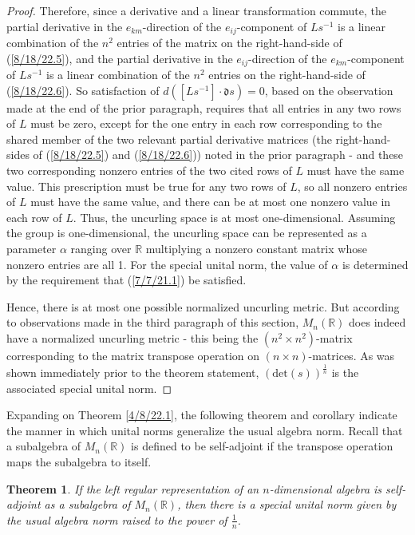 \documentclass{amsart}
\numberwithin{equation}{section}
\newtheorem{theorem}{Theorem}
\theoremstyle{definition}
\numberwithin{theorem}{section}
\begin{document}
\begin{proof}
Therefore, since a derivative and a linear transformation commute, the partial derivative in the $e_{km}$-direction of the $e_{ij}$-component of $Ls^{-1}$ is a linear combination of the $n^2$ entries of the matrix on the right-hand-side of (\ref{8/18/22.5}), and  the partial derivative in the $e_{ij}$-direction of the $e_{km}$-component of $Ls^{-1}$ is a linear combination of the $n^2$ entries on the right-hand-side of (\ref{8/18/22.6}).
So satisfaction of \mbox{$d\left([Ls^{-1}]\cdot \mathfrak{d}s\right) = 0$,} based on the observation made at the end of the prior paragraph, requires that all entries in any two rows of $L$ must be zero, except for the one entry in each row corresponding to the shared member of the two relevant partial derivative matrices (the right-hand-sides of (\ref{8/18/22.5}) and (\ref{8/18/22.6})) noted in the prior paragraph - and these two corresponding nonzero entries of the two cited rows of $L$ must have the same value.  This prescription must be true for any two rows of $L$, so all nonzero entries of $L$ must have the same value, and there can be at most one nonzero value in each row of $L$.  Thus, the uncurling space is at most one-dimensional. Assuming the group is one-dimensional, the uncurling space can be represented as a parameter $\alpha$ ranging over $\mathbb{R}$ multiplying a nonzero constant matrix whose nonzero entries are all 1.  
For the special unital norm, the value of $\alpha$ is determined by the requirement that (\ref{7/7/21.1}) be satisfied. 


Hence, there is at most one possible normalized uncurling metric.  But according to observations made in the third paragraph of this section, $ M_n(\mathbb{R})$ does indeed have a normalized uncurling metric - this being the $(n^2\times n^2)$-matrix corresponding to the matrix transpose operation on $(n\times n)$-matrices.  As was shown immediately prior to the theorem statement, $(\mbox{det}(s))^{\frac{1}{n}}$ is the associated special unital norm.  
 \end{proof}
 
 Expanding on Theorem \ref{4/8/22.1}, the following theorem and corollary indicate the manner in which unital norms generalize the usual algebra norm.  Recall that a subalgebra of $M_n(\mathbb{R})$ is defined to be self-adjoint if the transpose operation maps the subalgebra to itself.
 
  \begin{theorem}\label{5/13/22.1} If the left regular representation of an $n$-dimensional algebra is self-adjoint as a subalgebra of $M_n(\mathbb{R})$, then there is a special unital norm given by the usual algebra norm raised to the power of $\frac{1}{n}$.
\end{theorem}
\end{document}
